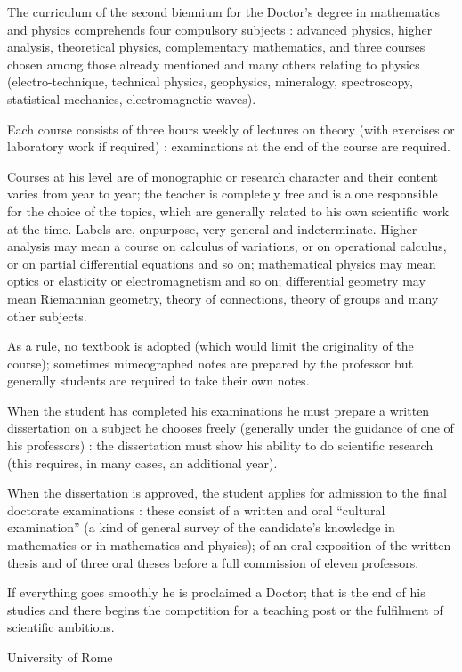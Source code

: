 The curriculum of the second biennium for the Doctor's degree in mathematics and physics comprehends four compulsory subjects : advanced physics, higher analysis, theoretical physics, complementary mathematics, and three courses chosen among those already mentioned and many others relating to physics (electro-technique, technical physics, geophysics, mineralogy, spectroscopy, statistical mechanics, electromagnetic waves).

Each course consists of three hours weekly of lectures on theory (with exercises or laboratory work if required) : examinations at the end of the course are required.

Courses at his level are of monographic or research character and their content varies from year to year; the teacher is completely free and is alone responsible for the choice of the topics, which are generally related to his own scientific work at the time. Labels are, on\pageoriginale purpose, very general and indeterminate. Higher analysis may mean a course on calculus of variations, or on operational calculus, or on partial differential equations and so on; mathematical physics may mean optics or elasticity or electromagnetism and so on; differential geometry may mean Riemannian geometry, theory of connections, theory of groups and many other subjects.

As a rule, no textbook is adopted (which would limit the originality of the course); sometimes mimeographed notes are prepared by the professor but generally students are required to take their own notes.

When the student has completed his examinations he must prepare a written dissertation on a subject he chooses freely (generally under the guidance of one of his professors) : the dissertation must show his ability to do scientific research (this requires, in many cases, an additional year).

When the dissertation is approved, the student applies for admission to the final doctorate examinations : these consist of a written and oral ``cultural examination'' (a kind of general survey of the candidate's knowledge in mathematics or in mathematics and physics); of an oral exposition of the written thesis and of three oral theses before a full commission of eleven professors.

If everything goes smoothly he is proclaimed a Doctor; that is the end of his studies and there begins the competition for a teaching post or the fulfilment of scientific ambitions.

\bigskip
\medskip

{\fontsize{9pt}{11pt}\selectfont
University of Rome
}\relax


